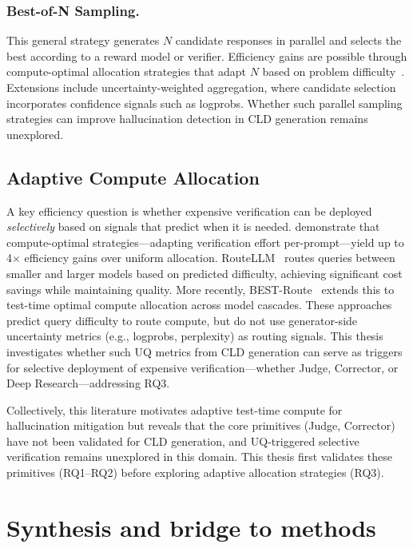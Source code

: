 \subsubsection{Best-of-N Sampling.} This general strategy generates $N$ candidate responses in parallel and selects the best according to a reward model or verifier. Efficiency gains are possible through compute-optimal allocation strategies that adapt $N$ based on problem difficulty~\citep{snell2024scalingllmtesttimecompute}. Extensions include uncertainty-weighted aggregation, where candidate selection incorporates confidence signals such as logprobs. Whether such parallel sampling strategies can improve hallucination detection in CLD generation remains unexplored.

\subsection{Adaptive Compute Allocation}

A key efficiency question is whether expensive verification can be deployed \emph{selectively} based on signals that predict when it is needed. \citet{snell2024scalingllmtesttimecompute} demonstrate that compute-optimal strategies---adapting verification effort per-prompt---yield up to 4$\times$ efficiency gains over uniform allocation. RouteLLM~\citep{ong2024routellm} routes queries between smaller and larger models based on predicted difficulty, achieving significant cost savings while maintaining quality. More recently, BEST-Route~\citep{ding2025bestroute} extends this to test-time optimal compute allocation across model cascades. These approaches predict query difficulty to route compute, but do not use generator-side uncertainty metrics (e.g., logprobs, perplexity) as routing signals. This thesis investigates whether such UQ metrics from CLD generation can serve as triggers for selective deployment of expensive verification---whether Judge, Corrector, or Deep Research---addressing RQ3.

\medskip
\noindent Collectively, this literature motivates adaptive test-time compute for hallucination mitigation but reveals that the core primitives (Judge, Corrector) have not been validated for CLD generation, and UQ-triggered selective verification remains unexplored in this domain. This thesis first validates these primitives (RQ1--RQ2) before exploring adaptive allocation strategies (RQ3).

\section{Synthesis and bridge to methods}
\label{sec:lit_bridge_to_methods}

